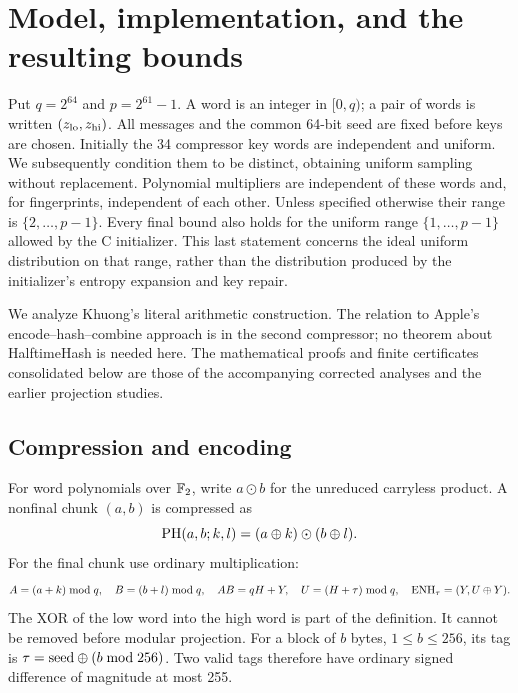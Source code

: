 \section{Model, implementation, and the resulting bounds}\label{sec:model}
Put $q=2^{64}$ and $p=2^{61}-1$. A word is an integer in $[0,q)$; a pair of words is written $(z_{\mathrm{lo}},z_{\mathrm{hi}})$. All messages and the common 64-bit seed are fixed before keys are chosen. Initially the 34 compressor key words are independent and uniform. We subsequently condition them to be distinct, obtaining uniform sampling without replacement. Polynomial multipliers are independent of these words and, for fingerprints, independent of each other. Unless specified otherwise their range is $\{2,\ldots,p-1\}$. Every final bound also holds for the uniform range $\{1,\ldots,p-1\}$ allowed by the C initializer. This last statement concerns the ideal uniform distribution on that range, rather than the distribution produced by the initializer's entropy expansion and key repair.

We analyze Khuong's literal arithmetic construction\cite{khuong2022}. The relation to Apple's encode--hash--combine approach\cite{apple2021} is in the second compressor; no theorem about HalftimeHash is needed here. The mathematical proofs and finite certificates consolidated below are those of the accompanying corrected analyses and the earlier projection studies\cite{gap,jointprior,enhprior,corrected}.

\subsection{Compression and encoding}
For word polynomials over $\mathbb F_2$, write $a\odot b$ for the unreduced carryless product. A nonfinal chunk $(a,b)$ is compressed as
\[
 \operatorname{PH}(a,b;k,l)=(a\mathbin\oplus k)\odot(b\mathbin\oplus l).
\]
For the final chunk use ordinary multiplication:
\begin{equation}\label{eq:enh}
 A=(a+k)\bmod q,\quad B=(b+l)\bmod q,\quad AB=qH+Y,
 \quad U=(H+\tau)\bmod q,\quad \operatorname{ENH}_\tau=(Y,U\mathbin\oplus Y).
\end{equation}
The XOR of the low word into the high word is part of the definition. It cannot be removed before modular projection. For a block of $b$ bytes, $1\le b\le256$, its tag is $\tau=\mathrm{seed}\mathbin\oplus(b\bmod256)$. Two valid tags therefore have ordinary signed difference of magnitude at most 255.

